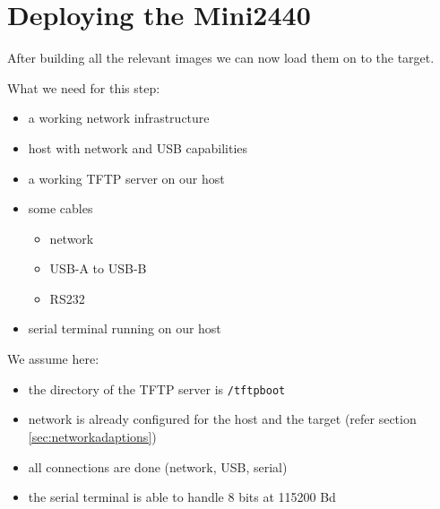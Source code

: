 %
%
%
%
%
%
%

\section{Deploying the Mini2440}	\label{sec:deploying}

After building all the relevant images we can now load them on to the target.

What we need for this step:

\begin{itemize}
 \item a working network infrastructure
 \item host with network and USB capabilities
 \item a working TFTP server on our host
 \item some cables
 \begin{itemize}
  \item network
  \item USB-A to USB-B
  \item RS232
 \end{itemize}
 \item serial terminal running on our host
\end{itemize}

We assume here:

\begin{itemize}
 \item the directory of the TFTP server is \texttt{/tftpboot}
 \item network is already configured for the host and the target
       (refer section \ref{sec:networkadaptions})
 \item all connections are done (network, USB, serial)
 \item the serial terminal is able to handle 8 bits at 115200 Bd
\end{itemize}

